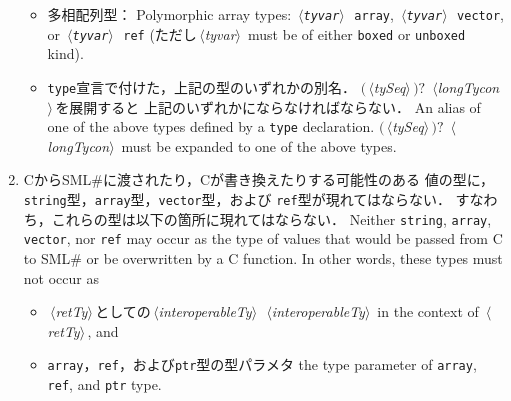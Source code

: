 \documentclass{jbook}
\newcommand{\txt}[2]{#2}
\newcommand{\smlsharp}{SML\#}
\newcommand{\nonterm}[1]{\mbox{$\,\langle$}{\it #1}\mbox{$\rangle\,$}}
\newcommand{\term}[1]{\mbox{{\tt #1}}}
\newcommand{\optional}[1]{\mbox{$($}{\protect #1}\mbox{$)?$}}
\begin{document}
\begin{enumerate}
\begin{itemize}
\item
\ifjp%
	多相配列型：
\else%
	Polymorphic array types:
\fi%
\term{\nonterm{tyvar}\ array},
\term{\nonterm{tyvar}\ vector},
\txt{または}{or}
\term{\nonterm{tyvar}\ ref}
(ただし\txt{\nonterm{tyvar}は\term{boxed}カインドまたは\term{unboxed}カインドを
持つものに限る}
{\nonterm{tyvar} must be of either \term{boxed} or \term{unboxed} kind}).

\item
\ifjp%
	\term{type}宣言で付けた，上記の型のいずれかの別名．
	\optional{\nonterm{tySeq}} \nonterm{longTycon}を展開すると
上記のいずれかにならなければならない．
\else%
	An alias of one of the above types defined by a \term{type}
declaration.
	\optional{\nonterm{tySeq}} \nonterm{longTycon} must be
expanded to one of the above types.
\fi%

 \end{itemize}

\item
\ifjp%
	Cから\smlsharp{}に渡されたり，Cが書き換えたりする可能性のある
値の型に，\term{string}型，\term{array}型，\term{vector}型，および
\term{ref}型が現れてはならない．
	すなわち，これらの型は以下の箇所に現れてはならない．
\else%
	Neither \term{string}, \term{array}, \term{vector}, nor \term{ref}
may occur as the type of values that would be passed from C to \smlsharp{}
or be overwritten by a C function.
	In other words,
these types must not occur as
\fi%

\begin{itemize}
\item
\ifjp%
	\nonterm{retTy}としての\nonterm{interoperableTy}
\else%
	\nonterm{interoperableTy} in the context of \nonterm{retTy}, and
\fi%

\item
\ifjp%
	\term{array}，\term{ref}，および\term{ptr}型の型パラメタ
\else%
	the type parameter of \term{array}, \term{ref}, and \term{ptr} type.
\fi%

\end{itemize}

\end{enumerate}
\end{document}
